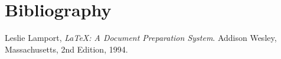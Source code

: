 


\section{Bibliography}
\begin{thebibliography}{99}

  Leslie Lamport,
  \emph{\LaTeX: A Document Preparation System}.
  Addison Wesley, Massachusetts,
  2nd Edition,
  1994.

\end{thebibliography}